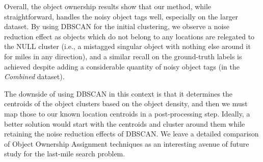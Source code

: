 Overall, the object ownership results show that our method, while straightforward, handles the noisy object tags well, especially on the larger dataset. By using DBSCAN for the initial clustering, we observe a noise reduction effect as objects which do not belong to any locations are relegated to the NULL cluster (i.e., a mistagged singular object with nothing else around it for miles in any direction), and a similar recall on the ground-truth labels is achieved despite adding a considerable quantity of noisy object tags (in the \textit{Combined} dataset). 

The downside of using DBSCAN in this context is that it determines the centroids of the object clusters based on the object density, and then we must map those to our known location centroids in a post-processing step. 
Ideally, a better solution would start with the centroids and cluster around them while retaining the noise reduction effects of DBSCAN.
We leave a detailed comparison of Object Ownership Assignment techniques as an interesting avenue of future study for the last-mile search problem.





